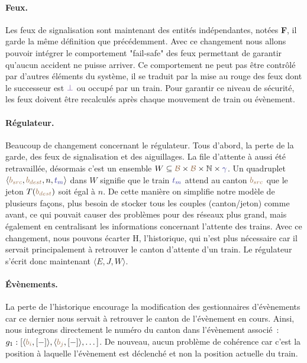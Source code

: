 \documentclass[oneside, a4paper, 11pt]{book}
\newcommand{\nats}{\ensuremath{\mathbb{N}}}
\newcommand{\trainFmt}[1]{{\color{traincolor} #1}}
\newcommand{\tid}[1]{\ensuremath{\trainFmt{t_{#1}}}}
\newcommand{\posFmt}[1]{{\color{poscolor}{#1}}}
\newcommand{\bid}[1]{\ensuremath{\posFmt{b_{#1}}}}
\newcommand{\tokenOf}[1]{\ensuremath{T(\posFmt{#1})}}
\newcommand{\swFmt}[1]{{\color{swcolor}{#1}}}
\newcommand{\nosuc}{\ensuremath{\swFmt{\bot}}}
\begin{document}
\paragraph{Feux.}Les feux de signalisation sont maintenant des entités indépendantes, notées \textbf{F}, il garde la même définition que précédemment. Avec ce changement nous allons pouvoir intégrer le comportement "fail-safe" des feux permettant de garantir qu'aucun accident ne puisse arriver.
Ce comportement ne peut pas être contrôlé par d'autres éléments du système, il se traduit par la mise au rouge des feux dont le successeur est $\nosuc$ ou occupé par un train. 
Pour garantir ce niveau de sécurité, les feux doivent être recalculés après chaque mouvement de train ou évènement.


\paragraph{Régulateur.} Beaucoup de changement concernant le régulateur. Tous d'abord, la perte de la garde, des feux de signalisation et des aiguillages. La file d'attente à aussi été retravaillée, désormais c'est un ensemble $W \subseteq \posFmt{\mathcal{B}} \times \posFmt{\mathcal{B}} \times \nats \times \trainFmt{\gamma}$. Un quadruplet $\langle \bid{src}, \bid{dest}, n, \tid{m} \rangle$ dans $W$ signifie que le train \tid{m} attend au canton \bid{src} que le jeton \tokenOf{\bid{dest}} soit égal à $n$.
De cette manière on simplifie notre modèle de plusieurs façons, plus besoin de stocker tous les couples (canton/jeton) comme avant, ce qui pouvait causer des problèmes pour des réseaux plus grand, mais également en centralisant les informations concernant l'attente des trains. Avec ce changement, nous pouvons écarter H, l'historique, qui n'est plus nécessaire car il servait principalement à retrouver le canton d'attente d'un train.
Le régulateur s'écrit donc maintenant $\langle E, J, W \rangle$.

\paragraph{Évènements.} La perte de l'historique encourage la modification des gestionnaires d'évènements car ce dernier nous servait à retrouver le canton de l'évènement en cours. Ainsi, nous integrons directement le numéro du canton dans l'évènement associé~: $g_1 : [\langle \bid{i}, [-]\rangle, \langle \bid{j}, [-]\rangle,\dots]$.
De nouveau, aucun problème de cohérence car c'est la position à laquelle l'évènement est déclenché et non la position actuelle du train.
\end{document}
